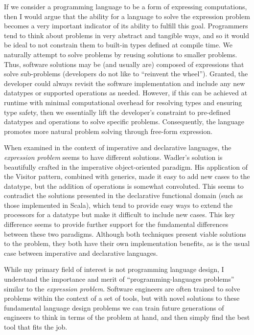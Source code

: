 \documentclass[12pt,letterpaper]{article}
\begin{document}
If we consider a programming language to be a form of expressing computations, then I would 
argue that the ability for a language
to solve the expression problem becomes a very important indicator of its ability to fulfill this goal. 
Programmers tend to think about problems in very abstract and tangible ways, and so it would be ideal
to not constrain them to built-in types defined at compile time. We naturally attempt to solve problems
by reusing solutions to smaller problems. Thus, software solutions may be (and usually are) 
composed of expressions that solve sub-problems (developers do not like to ``reinvent the wheel'').
Granted, the developer could always revisit the software implementation and include any new
datatypes or supported operations as needed. However, if this can be achieved at runtime with minimal computational
overhead for resolving types and ensuring type safety, then we essentially lift the developer's 
constraint to pre-defined datatypes and operations to solve specific problems. Consequently, 
the language promotes more natural problem solving through free-form expression. 

When examined in the context of imperative and declarative languages, the \emph{expression problem}
seems to have different solutions. Wadler's solution is beautifully crafted in the imperative object-oriented paradigm. 
His application of the Visitor pattern, combined with generics, made it easy to add new cases
to the datatype, but the addition of operations is somewhat convoluted. This seems to contradict the 
solutions presented in the declarative functional domain (such as those implemented in Scala), 
which tend to provide easy ways to extend the processors for a datatype but make it difficult to include new cases. 
This key difference seems to provide further support for the fundamental differences between these two paradigms.
Although both techniques present viable solutions to the problem, they both have their own implementation
benefits, as is the usual case between imperative and declarative languages. 

While my primary field of interest is not programming language design, I understand the importance
and merit of ``programming-languages problems'' similar to the \emph{expression problem}. Software engineers
are often trained to solve problems within the context of a set of tools, but with novel solutions
to these fundamental language design problems we can train future generations of engineers to
think in terms of the problem at hand, and then simply find the best tool that fits the job. 



\end{document}
